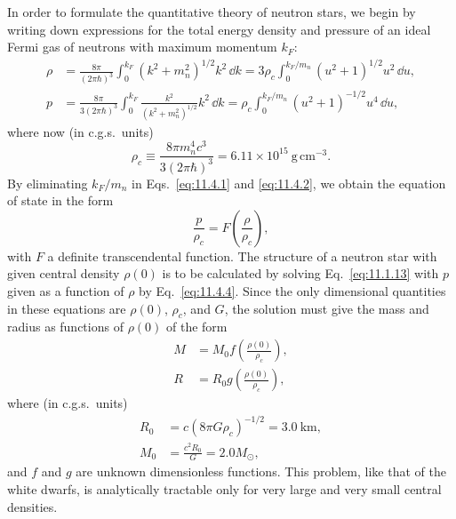 In order to formulate the quantitative theory of neutron stars, we begin by
writing down expressions for the total energy density and pressure of an ideal
Fermi gas of neutrons with maximum momentum \(k_F\):
\begin{align}
  \rho
  &=
  \frac{8\pi}{(2\pi\hbar)^3}
  \int_0^{k_F}(k^2+m_n^2)^{1/2}k^2\,\dd k
  =
  3\rho_c\int_0^{k_F/m_n}(u^2+1)^{1/2}u^2\,\dd u,
  \tag{11.4.1}\label{eq:11.4.1}\\
  p
  &=
  \frac{8\pi}{3(2\pi\hbar)^3}
  \int_0^{k_F}\frac{k^2}{(k^2+m_n^2)^{1/2}}k^2\,\dd k
  =
  \rho_c\int_0^{k_F/m_n}(u^2+1)^{-1/2}u^4\,\dd u,
  \tag{11.4.2}\label{eq:11.4.2}
\end{align}
where now (in c.g.s.\ units)
\begin{equation}
  \rho_c
  \equiv
  \frac{8\pi m_n^4c^3}{3(2\pi\hbar)^3}
  =
  6.11\times10^{15}\ \mathrm{g\,cm^{-3}}.
  \tag{11.4.3}\label{eq:11.4.3}
\end{equation}
By eliminating \(k_F/m_n\) in Eqs.~\eqref{eq:11.4.1} and
\eqref{eq:11.4.2}, we obtain the equation of state in the form
\begin{equation}
  \frac p{\rho_c}
  =
  F\left(\frac{\rho}{\rho_c}\right),
  \tag{11.4.4}\label{eq:11.4.4}
\end{equation}
with \(F\) a definite transcendental function. The structure of a neutron star
with given central density \(\rho(0)\) is to be calculated by solving
Eq.~\eqref{eq:11.1.13} with \(p\) given as a function of \(\rho\) by
Eq.~\eqref{eq:11.4.4}. Since the only dimensional quantities in these
equations are \(\rho(0)\), \(\rho_c\), and \(G\), the solution must give the
mass and radius as functions of \(\rho(0)\) of the form
\begin{align}
  M&=M_0f\left(\frac{\rho(0)}{\rho_c}\right),
  \tag{11.4.5}\label{eq:11.4.5}\\
  R&=R_0g\left(\frac{\rho(0)}{\rho_c}\right),
  \tag{11.4.6}\label{eq:11.4.6}
\end{align}
where (in c.g.s.\ units)
\begin{align}
  R_0&=c(8\pi G\rho_c)^{-1/2}=3.0\ \mathrm{km},
  \tag{11.4.7}\label{eq:11.4.7}\\
  M_0&=\frac{c^2R_0}{G}=2.0M_\odot,
  \tag{11.4.8}\label{eq:11.4.8}
\end{align}
and \(f\) and \(g\) are unknown dimensionless functions. This problem, like
that of the white dwarfs, is analytically tractable only for very large and
very small central densities.


